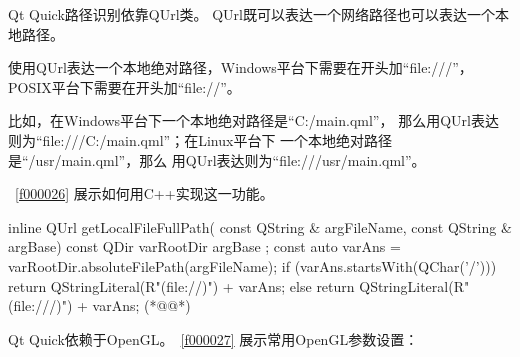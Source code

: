 Qt Quick路径识别依靠QUrl类。
QUrl既可以表达一个网络路径也可以表达一个本地路径。

使用QUrl表达一个本地绝对路径，Windows平台下需要在开头加“file:///”，
POSIX平台下需要在开头加“file://”。

比如，在Windows平台下一个本地绝对路径是“C:/main.qml”，
那么用QUrl表达则为“file:///C:/main.qml”；在Linux平台下
一个本地绝对路径是“/usr/main.qml”，那么
用QUrl表达则为“file:///usr/main.qml”。

\filesourcenumbernameone\ \ref{f000026}
展示如何用C{\sourcefonttwo{}+}{\sourcefonttwo{}+}实现这一功能。

\label{f000026}    %
\FloatBarrier                                  %
\begin{thebookfilesourceone}[escapeinside={(*@}{@*)},
caption=GoodLuck,
title=\filesourcenumbernameone \thefilesourcenumber
,firstnumber=6]
inline QUrl getLocalFileFullPath(
    const QString & argFileName,
    const QString & argBase) {
    const QDir varRootDir{ argBase };
    const auto varAns = varRootDir.absoluteFilePath(argFileName);
    if (varAns.startsWith(QChar('/'))) {
        return QStringLiteral(R"(file://)") + varAns;
    } else {
        return QStringLiteral(R"(file:///)") + varAns;
    }
}(*@\marginpar[\hfill\setlength\fboxsep{2pt}\fbox{\footnotesize{\kaishu\parbox{1em}{\setlength{\baselineskip}{2pt}\filesourcenumbernameone}}\footnotesize{\thefilesourcenumber}}]{\setlength\fboxsep{2pt}\fbox{\footnotesize{\kaishu\parbox{1em}{\setlength{\baselineskip}{2pt}\filesourcenumbernameone}}\footnotesize{\thefilesourcenumber}}}@*)\end{thebookfilesourceone}          %
\addtocounter{lstlisting}{-1}   %

Qt Quick依赖于OpenGL。\filesourcenumbernameone\ \ref{f000027}
展示常用OpenGL参数设置：

